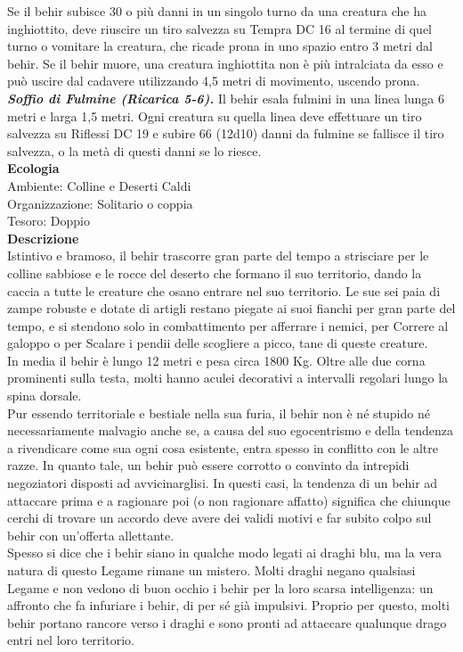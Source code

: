 \begin{multicols}{2}
Se il behir subisce 30 o più danni in un singolo turno da una creatura che ha inghiottito, deve riuscire un tiro salvezza su Tempra DC  16 al termine di quel turno o vomitare la creatura, che ricade prona in uno spazio entro 3 metri dal behir. Se il behir muore, una creatura inghiottita non è più intralciata da esso e può uscire dal cadavere utilizzando 4,5 metri di movimento, uscendo prona.\\
\emph{\textbf{Soffio di Fulmine (Ricarica 5-6).}} Il behir esala fulmini in una linea lunga 6 metri e larga 1,5 metri. Ogni creatura su quella linea deve effettuare un tiro salvezza su Riflessi DC  19 e subire 66 (12d10) danni da fulmine se fallisce il tiro salvezza, o la metà di questi danni se lo riesce.\\
\textbf{Ecologia}\\
Ambiente: Colline e Deserti Caldi\\
Organizzazione: Solitario o coppia\\
Tesoro: Doppio\\
\textbf{Descrizione}\\
Istintivo e bramoso, il behir trascorre gran parte del tempo a strisciare per le colline sabbiose e le rocce del deserto che formano il suo territorio, dando la caccia a tutte le creature che osano entrare nel suo territorio. Le sue sei paia di zampe robuste e dotate di artigli restano piegate ai suoi fianchi per gran parte del tempo, e si stendono solo in combattimento per afferrare i nemici, per Correre al galoppo o per Scalare i pendii delle scogliere a picco, tane di queste creature.\\
In media il behir è lungo 12 metri e pesa circa 1800 Kg. Oltre alle due corna prominenti sulla testa, molti hanno aculei decorativi a intervalli regolari lungo la spina dorsale.\\
Pur essendo territoriale e bestiale nella sua furia, il behir non è né stupido né necessariamente malvagio anche se, a causa del suo egocentrismo e della tendenza a rivendicare come sua ogni cosa esistente, entra spesso in conflitto con le altre razze. In quanto tale, un behir può essere corrotto o convinto da intrepidi negoziatori disposti ad avvicinarglisi. In questi casi, la tendenza di un behir ad attaccare prima e a ragionare poi (o non ragionare affatto) significa che chiunque cerchi di trovare un accordo deve avere dei validi motivi e far subito colpo sul behir con un’offerta allettante.\\
Spesso si dice che i behir siano in qualche modo legati ai draghi blu, ma la vera natura di questo Legame rimane un mistero. Molti draghi negano qualsiasi Legame e non vedono di buon occhio i behir per la loro scarsa intelligenza: un affronto che fa infuriare i behir, di per sé già impulsivi. Proprio per questo, molti behir portano rancore verso i draghi e sono pronti ad attaccare qualunque drago entri nel loro territorio.\\


\end{multicols}
